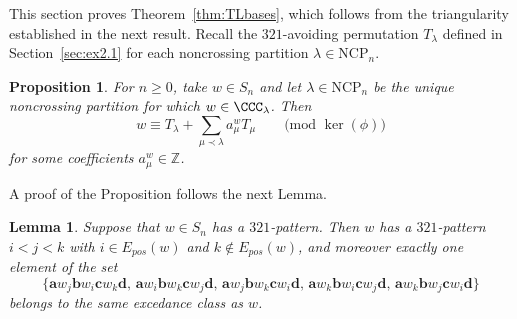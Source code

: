 \documentclass[12pt]{amsart}
\newtheorem{prop}[equation]{Proposition}
\newtheorem{lem}[equation]{Lemma}
\theoremstyle{definition}
\theoremstyle{remark}
\numberwithin{equation}{section}
\newcommand{\ZZ}{\mathbb{Z}}
\newcommand{\NCP}{\mathrm{NCP}}
\newcommand{\EP}{E_{pos}}
\begin{document}
This section proves Theorem~\ref{thm:TLbases}, which follows from the triangularity established in the next result.  Recall the $321$-avoiding permutation $T_{\lambda}$ defined in Section~\ref{sec:ex2.1} for each noncrossing partition $\lambda \in \NCP_{n}$.

\begin{prop}
\label{prop:TLbases}
For $n \ge 0$, take $w \in S_{n}$ and let $\lambda \in \NCP_{n}$ be the unique noncrossing partition for which $w \in \CCC_{\lambda}$.  Then
\[
w \equiv T_{\lambda} + \sum_{\mu \prec \lambda} a_{\mu}^{w} T_{\mu} \qquad \text{(mod $\ker(\phi)$)}
\]
for some coefficients $a_{\mu}^{w} \in \ZZ$.
\end{prop}

A proof of the Proposition follows the next Lemma.

\begin{lem}
\label{lem:321excedance}
Suppose that $w \in S_{n}$ has a $321$-pattern.  Then $w$ has a $321$-pattern $i < j < k$ with $i \in \EP(w)$ and $k \notin \EP(w)$, and moreover exactly one element of the set 
\[
\{
\mathbf{a}w_{j}\mathbf{b}w_{i}\mathbf{c}w_{k}\mathbf{d},  \,
\mathbf{a}w_{i}\mathbf{b}w_{k}\mathbf{c}w_{j}\mathbf{d}, \,
\mathbf{a}w_{j}\mathbf{b}w_{k}\mathbf{c}w_{i}\mathbf{d}, \,
\mathbf{a}w_{k}\mathbf{b}w_{i}\mathbf{c}w_{j}\mathbf{d}, \,
\mathbf{a}w_{k}\mathbf{b}w_{j}\mathbf{c}w_{i}\mathbf{d}
\}
\]
belongs to the same excedance class as $w$.
\end{lem}
\end{document}
